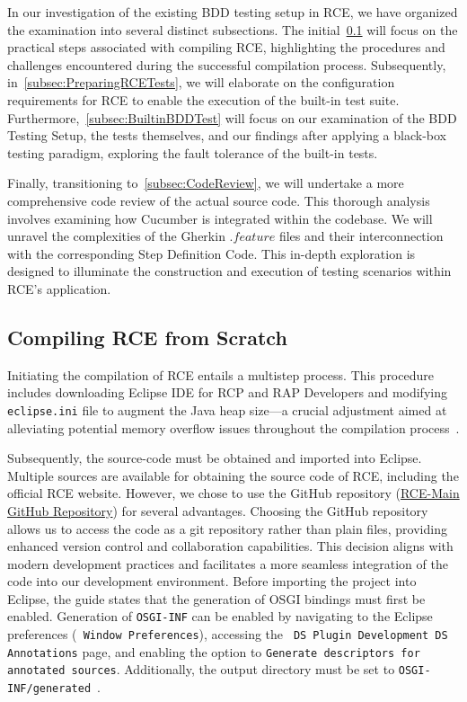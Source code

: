 \label{sec:examination}
In our investigation of the existing BDD testing setup in \ac{RCE}, we have organized the examination into several distinct subsections. The initial~\cref{subsec:BuildingRCE} will focus on the practical steps associated with compiling \ac{RCE}, highlighting the procedures and challenges encountered during the successful compilation process. Subsequently, in~\cref{subsec:PreparingRCETests}, we will elaborate on the configuration requirements for \ac{RCE} to enable the execution of the built-in test suite. Furthermore,~\cref{subsec:BuiltinBDDTest} will focus on our examination of the BDD Testing Setup, the tests themselves, and our findings after applying a black-box testing paradigm, exploring the fault tolerance of the built-in tests.

Finally, transitioning to~\cref{subsec:CodeReview}, we will undertake a more comprehensive code review of the actual source code. This thorough analysis involves examining how Cucumber is integrated within the codebase. We will unravel the complexities of the Gherkin $.feature$ files and their interconnection with the corresponding Step Definition Code. This in-depth exploration is designed to illuminate the construction and execution of testing scenarios within \ac{RCE}'s application.

\subsection{Compiling \ac{RCE} from Scratch}
\label{subsec:BuildingRCE}
Initiating the compilation of \ac{RCE} entails a multistep process. This procedure includes downloading Eclipse IDE for RCP and RAP Developers and modifying \texttt{eclipse.ini} file to augment the Java heap size—a crucial adjustment aimed at alleviating potential memory overflow issues throughout the compilation process~\cite{rceDevGuide10x}.

Subsequently, the source-code must be obtained and imported into Eclipse. Multiple sources are available for obtaining the source code of \ac{RCE}, including the official RCE website. However, we chose to use the GitHub repository (\href{https://github.com/rcenvironment/rce-main}{RCE-Main GitHub Repository}) for several advantages. Choosing the GitHub repository allows us to access the code as a git repository rather than plain files, providing enhanced version control and collaboration capabilities. This decision aligns with modern development practices and facilitates a more seamless integration of the code into our development environment. Before importing the project into Eclipse, the guide states that the generation of OSGI bindings must first be enabled. Generation of \texttt{OSGI-INF} can be enabled by navigating to the Eclipse preferences (\texttt{ Window Preferences}), accessing the \texttt{ DS Plugin Development DS Annotations} page, and enabling the option to \texttt{Generate descriptors for annotated sources}. Additionally, the output directory must be set to \texttt{OSGI-INF/generated}~\cite{rceDevGuide10x}.

